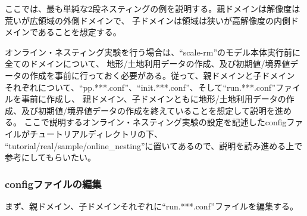 ここでは、最も単純な2段ネスティングの例を説明する。親ドメインは解像度は荒いが広領域の外側ドメインで、
子ドメインは領域は狭いが高解像度の内側ドメインであることを想定する。

オンライン・ネスティング実験を行う場合は、``scale-rm''のモデル本体実行前に全てのドメインについて、
地形/土地利用データの作成、及び初期値/境界値データの作成を事前に行っておく必要がある。従って、親ドメインと子ドメイン
それぞれについて、``pp.***.conf''、``init.***.conf''、そして``run.***.conf''ファイルを事前に作成し、
親ドメイン、子ドメインともに地形/土地利用データの作成、及び初期値/境界値データの作成を終えていることを想定して説明を進める。
ここで説明するオンライン・ネスティング実験の設定を記述したconfigファイルがチュートリアルディレクトリの下、
``tutorial/real/sample/online\_nesting''に置いてあるので、説明を読み進める上で参考にしてもらいたい。


\subsubsection{configファイルの編集}
まず、親ドメイン、子ドメインそれぞれに``run.***.conf''ファイルを編集する。

\\
{\small {\gt
{}}}\\

\vspace{0.5cm}

\\
{\small {\gt
{}}}\\

